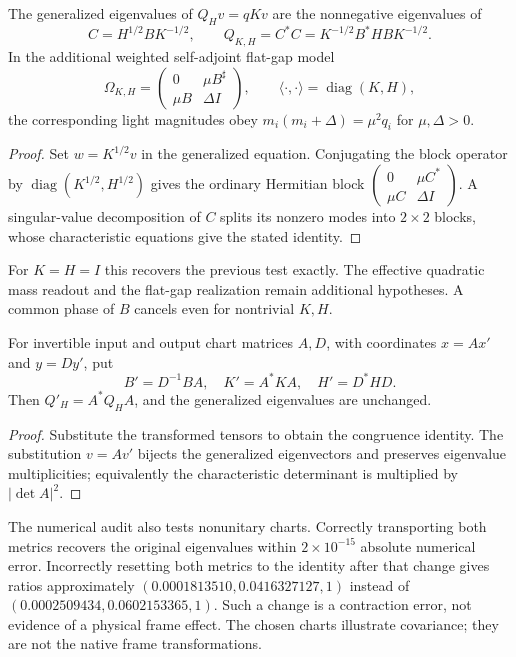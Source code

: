 \begin{proposition}
\label{v480:tensor-generalized-spectrum}
The generalized eigenvalues of $Q_Hv=qKv$ are the nonnegative
eigenvalues of
\[
 C=H^{1/2}BK^{-1/2},\qquad
 Q_{K,H}=C^*C=K^{-1/2}B^*HBK^{-1/2}.
\]
In the additional weighted self-adjoint flat-gap model
\[
 \Omega_{K,H}=
 \begin{pmatrix}0&\mu B^\sharp\\ \mu B&\Delta I\end{pmatrix},
 \qquad \langle\cdot,\cdot\rangle=\operatorname{diag}(K,H),
\]
the corresponding light magnitudes obey
$m_i(m_i+\Delta)=\mu^2q_i$ for $\mu,\Delta>0$.
\end{proposition}
\begin{proof}
Set $w=K^{1/2}v$ in the generalized equation. Conjugating the block
operator by $\operatorname{diag}(K^{1/2},H^{1/2})$ gives the ordinary
Hermitian block $\left(\begin{smallmatrix}0&\mu C^*\\
\mu C&\Delta I\end{smallmatrix}\right)$. A singular-value
decomposition of $C$ splits its nonzero modes into $2\times2$ blocks,
whose characteristic equations give the stated identity.
\end{proof}

For $K=H=I$ this recovers the previous test exactly. The effective
quadratic mass readout and the flat-gap realization remain additional
hypotheses. A common phase of $B$ cancels even for nontrivial $K,H$.

\begin{proposition}
\label{v480:tensor-chart-covariance}
For invertible input and output chart matrices $A,D$, with coordinates
$x=Ax'$ and $y=Dy'$, put
\[
 B'=D^{-1}BA,\quad K'=A^*KA,\quad H'=D^*HD.
\]
Then $Q'_H=A^*Q_HA$, and the generalized eigenvalues are unchanged.
\end{proposition}
\begin{proof}
Substitute the transformed tensors to obtain the congruence identity.
The substitution $v=Av'$ bijects the generalized eigenvectors and
preserves eigenvalue multiplicities; equivalently the characteristic
determinant is multiplied by $|\det A|^2$.
\end{proof}

The numerical audit also tests nonunitary charts. Correctly transporting
both metrics recovers the original eigenvalues within
$2\times10^{-15}$ absolute numerical error. Incorrectly resetting both
metrics to the identity after that change gives ratios approximately
$(0.0001813510,0.0416327127,1)$ instead of
$(0.0002509434,0.0602153365,1)$. Such a change is a contraction error,
not evidence of a physical frame effect. The chosen charts illustrate
covariance; they are not the native frame transformations.

